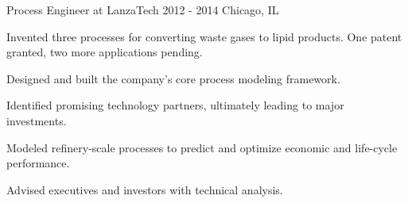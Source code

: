 \begin{cventries}
     
     
%      
  \cventrynew
    {Process Engineer at LanzaTech} 
    {2012 - 2014} 
    {Chicago, IL} 
    {
      \begin{cvitems}
        \item {Invented three processes for converting waste gases to lipid products. One patent granted, two more applications pending.}
		\item {Designed and built the company's core process modeling framework.}        
		\item {Identified promising technology partners, ultimately leading to major investments.}
        \item {Modeled refinery-scale processes to predict and optimize economic and life-cycle performance.}        
        \item {Advised executives and investors with technical analysis.}
      \end{cvitems}
    }
    

\end{cventries}
